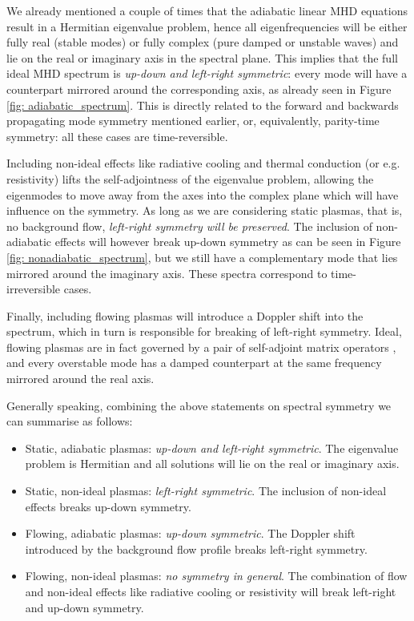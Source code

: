We already mentioned a couple of times that the adiabatic linear MHD equations result in a Hermitian eigenvalue problem, hence all eigenfrequencies will be either fully real (stable modes) or fully complex (pure damped or unstable waves) and lie on the real or imaginary axis in the spectral plane. This implies that the full ideal MHD spectrum is \emph{up-down and left-right symmetric}: every mode will have a counterpart mirrored around the corresponding axis, as already seen in Figure \ref{fig: adiabatic_spectrum}. This is directly related to the forward and backwards propagating mode symmetry mentioned earlier, or, equivalently, parity-time symmetry: all these cases are time-reversible.

Including non-ideal effects like radiative cooling and thermal conduction (or e.g. resistivity) lifts the self-adjointness of the eigenvalue problem, allowing the eigenmodes to move away from the axes into the complex plane which will have influence on the symmetry. As long as we are considering static plasmas, that is, no background flow, \emph{left-right symmetry will be preserved}. The inclusion of non-adiabatic effects will however break up-down symmetry as can be seen in Figure \ref{fig: nonadiabatic_spectrum}, but we still have a complementary mode that lies mirrored around the imaginary axis. These spectra correspond to time-irreversible cases.

Finally, including flowing plasmas will introduce a Doppler shift into the spectrum, which in turn is responsible for breaking of left-right symmetry. Ideal, flowing plasmas are in fact governed by a pair of self-adjoint matrix operators \citep{book_MHD}, and every overstable mode has a damped counterpart at the same frequency mirrored around the real axis.

Generally speaking, combining the above statements on spectral symmetry we can summarise as follows:
\begin{itemize}
  \item Static, adiabatic plasmas: \emph{up-down and left-right symmetric}. The eigenvalue problem is Hermitian and all solutions will lie on the real or imaginary axis.
  \item Static, non-ideal plasmas: \emph{left-right symmetric}. The inclusion of non-ideal effects breaks up-down symmetry.
  \item Flowing, adiabatic plasmas: \emph{up-down symmetric}. The Doppler shift introduced by the background flow profile breaks left-right symmetry.
  \item Flowing, non-ideal plasmas: \emph{no symmetry in general}. The combination of flow and non-ideal effects like radiative cooling or resistivity will break left-right and up-down symmetry.
\end{itemize}

